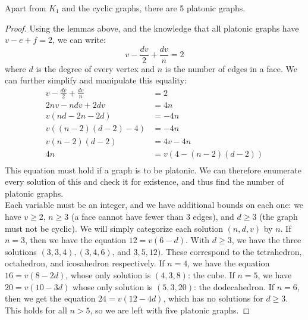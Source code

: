 \begin{theorem}[Euclid] Apart from $K_1$ and the cyclic graphs, there are 5 platonic graphs.
\end{theorem}
\begin{proof}
  Using the lemmas above, and the knowledge that all platonic graphs have $v - e + f = 2$, we can write:
  $$v - \frac{dv}{2} + \frac{dv}{n} = 2$$
  where $d$ is the degree of every vertex and $n$ is the number of edges in a face. We can further simplify and manipulate this equality:
  \begin{align*}
    v - \frac{dv}{2} + \frac{dv}{n} &= 2 \\
    2nv - ndv + 2dv &= 4n \\
    v(nd - 2n - 2d) &= -4n \\
    v\left( (n-2)(d-2) - 4\right) &= -4n \\
    v(n-2)(d-2) &= 4v -4n \\
    4n &= v(4 - (n-2)(d-2)) \\
  \end{align*}
  This equation must hold if a graph is to be platonic. We can therefore enumerate every solution of this and check it for existence, and thus find the number of platonic graphs. \\
  Each variable must be an integer, and we have additional bounds on each one: we have $v \ge 2$, $n \ge 3$ (a face cannot have fewer than $3$ edges), and $d \ge 3$ (the graph must not be cyclic). We will simply categorize each solution $(n, d, v)$ by $n$. If $n = 3$, then we have the equation $12 = v(6 - d)$. With $d \ge 3$, we have the three solutions $(3, 3, 4), (3, 4, 6)$, and $3, 5, 12)$. These correspond to the tetrahedron, octahedron, and icosahedron respectively. If $n = 4$, we have the equation $16 = v(8 - 2d)$, whose only solution is $(4, 3, 8)$: the cube. If $n = 5$, we have $20 = v(10 - 3d)$ whose only solution is $(5, 3, 20)$: the dodecahedron. If $n = 6$, then we get the equation $24 = v(12 - 4d)$, which has no solutions for $d \ge 3$. This holds for all $n > 5$, so we are left with five platonic graphs.
\end{proof}

